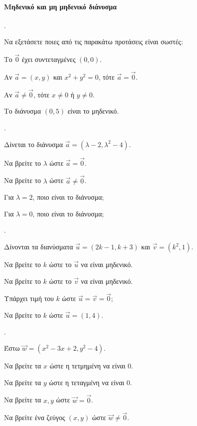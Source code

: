 \documentclass[11pt,a4paper,twocolumn]{article}
\newcounter{askhsh}
\newcommand{\askhsh}{\large\theaskhsh.\ \addtocounter{askhsh}{1}}
\begin{document}
\paragraph{Μηδενικό και μη μηδενικό διάνυσμα}
\askhsh Να εξετάσετε ποιες από τις παρακάτω προτάσεις είναι σωστές:
\begin{alist}
    \item Το $\vec{0}$ έχει συντεταγμένες $(0,0)$.
    \item Αν $\vec{a}=(x,y)$ και $x^2+y^2=0$, τότε $\vec{a}=\vec{0}$.
    \item Αν $\vec{a}\neq\vec{0}$, τότε $x\neq 0$ ή $y\neq 0$.
    \item Το διάνυσμα $(0,5)$ είναι το μηδενικό.
\end{alist}

\askhsh Δίνεται το διάνυσμα $\vec{a}=(\lambda-2, \lambda^2-4)$.

\begin{alist}
    \item Να βρείτε το $\lambda$ ώστε $\vec{a}=\vec{0}$.
    \item Να βρείτε το $\lambda$ ώστε $\vec{a}\neq\vec{0}$.
    \item Για $\lambda=2$, ποιο είναι το διάνυσμα;
    \item Για $\lambda=0$, ποιο είναι το διάνυσμα;
\end{alist}

\askhsh Δίνονται τα διανύσματα $\vec{u}=(2k-1, k+3)$ και $\vec{v}=(k^2, 1)$.

\begin{alist}
    \item Να βρείτε το $k$ ώστε το $\vec{u}$ να είναι μηδενικό.
    \item Να βρείτε το $k$ ώστε το $\vec{v}$ να είναι μηδενικό.
    \item Υπάρχει τιμή του $k$ ώστε $\vec{u}=\vec{v}=\vec{0}$;
    \item Να βρείτε το $k$ ώστε $\vec{u}=(1,4)$.
\end{alist}
\askhsh Έστω $\vec{w} = (x^2-3x+2, y^2-4)$.

\begin{alist}
    \item Να βρείτε τα $x$ ώστε η τετμημένη να είναι $0$.
    \item Να βρείτε τα $y$ ώστε η τεταγμένη να είναι $0$.
    \item Να βρείτε τα $x,y$ ώστε $\vec{w}=\vec{0}$.
    \item Να βρείτε ένα ζεύγος $(x,y)$ ώστε $\vec{w}\neq\vec{0}$.
\end{alist}
\end{document}
